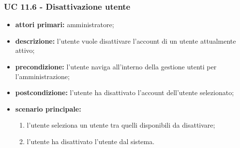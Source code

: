 			\subsubsection{UC 11.6 - Disattivazione utente}
			\begin{itemize}
				\item \textbf{attori primari:} amministratore;
				\item \textbf{descrizione:} l'utente vuole disattivare l'account di un utente attualmente attivo;
				\item \textbf{precondizione:} l'utente naviga all'interno della gestione utenti per l'amministrazione;
				\item \textbf{postcondizione:} l'utente ha disattivato l'account dell'utente selezionato;
				\item \textbf{scenario principale:}
				\begin{enumerate}
					\item{l'utente seleziona un utente tra quelli disponibili da disattivare;}
					\item{l'utente ha disattivato l'utente dal sistema.}
				\end{enumerate}
			\end{itemize}


			
